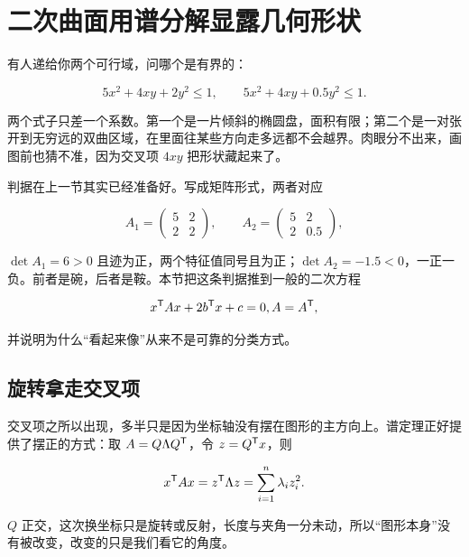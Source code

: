 \section{二次曲面用谱分解显露几何形状}
\label{sec:03-Linear-Algebra/06-Symmetric-and-Positive-Definite-Matrices/04}

有人递给你两个可行域，问哪个是有界的：

\[
5x^2+4xy+2y^2\le1,
\qquad
5x^2+4xy+0.5y^2\le1 .
\]

两个式子只差一个系数。第一个是一片倾斜的椭圆盘，面积有限；第二个是一对张开到无穷远的双曲区域，在里面往某些方向走多远都不会越界。肉眼分不出来，画图前也猜不准，因为交叉项 \(4xy\) 把形状藏起来了。

判据在上一节其实已经准备好。写成矩阵形式，两者对应

\[
A_1=\begin{pmatrix}5&2\\2&2\end{pmatrix},
\qquad
A_2=\begin{pmatrix}5&2\\2&0.5\end{pmatrix},
\]

\(\det A_1=6>0\) 且迹为正，两个特征值同号且为正；\(\det A_2=-1.5<0\)，一正一负。前者是碗，后者是鞍。本节把这条判据推到一般的二次方程

\[
x^{\mathsf{T}}Ax+2b^{\mathsf{T}}x+c=0,\space A=A^{\mathsf{T}},
\]

并说明为什么``看起来像''从来不是可靠的分类方式。

\subsection{旋转拿走交叉项}

交叉项之所以出现，多半只是因为坐标轴没有摆在图形的主方向上。谱定理正好提供了摆正的方式：取 \(A=Q\Lambda Q^{\mathsf{T}}\)，令 \(z=Q^{\mathsf{T}}x\)，则

\[
x^{\mathsf{T}}Ax=z^{\mathsf{T}}\Lambda z=\sum_{i=1}^{n}\lambda_iz_i^2 .
\]

\(Q\) 正交，这次换坐标只是旋转或反射，长度与夹角一分未动，所以``图形本身''没有被改变，改变的只是我们看它的角度。

